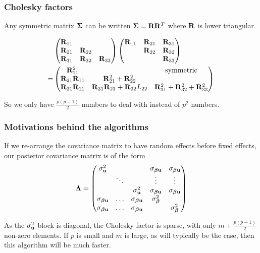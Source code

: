 \documentclass{beamer}
\begin{document}
\begin{frame}
\frametitle{Cholesky factors}
Any symmetric matrix ${\boldsymbol \Sigma}$ can be written ${\boldsymbol \Sigma} = {\bf R} {\bf R}^T$
where ${\bf R}$ is lower triangular.

\begin{align*}
&\begin{pmatrix}
{\bf R}_{11} \\
{\bf R}_{21} & {\bf R}_{22} \\
{\bf R}_{31} & {\bf R}_{32} & {\bf R}_{33}
\end{pmatrix}
\begin{pmatrix}
{\bf R}_{11} & {\bf R}_{21} & {\bf R}_{31} \\
& {\bf R}_{22} & {\bf R}_{32} \\
& & {\bf R}_{33}
\end{pmatrix}
\\
=& \begin{pmatrix}
{\bf R}_{11}^2 & & \text{symmetric}\\
{\bf R}_{21}{\bf R}_{11} & {\bf R}_{21}^2 + {\bf R}_{22}^2 \\
{\bf R}_{31} {\bf R}_{11} & {\bf R}_{31}{\bf R}_{21} + {\bf R}_{32}L_{22} & {\bf R}_{31}^2 + {\bf R}_{32} ^2 + {\bf R}_{33}^2
\end{pmatrix}
\end{align*}

So we only have $\frac{p(p-1)}{2}$ numbers to deal with instead of
$p^2$ numbers.

\end{frame}

\begin{frame}
\frametitle{Motivations behind the algorithms}
If we re-arrange the covariance matrix to have random effects before
fixed effects, our posterior covariance matrix is of the form
\begin{align*} {\boldsymbol\Lambda} =
\begin{pmatrix}
\sigma_{\bf u}^2 & & & \sigma_{{\boldsymbol \beta} {\bf u}} & \sigma_{{\boldsymbol \beta} {\bf u}} \\
& \ddots & & \vdots & \vdots \\
& & \sigma_{\bf u}^2 & \sigma_{{\boldsymbol \beta} {\bf u}} & \sigma_{{\boldsymbol \beta} {\bf u}} \\
\sigma_{{\boldsymbol \beta} {\bf u}} & \ldots & \sigma_{{\boldsymbol \beta} {\bf u}} & \sigma_{\boldsymbol \beta}^2 \\
\sigma_{{\boldsymbol \beta} {\bf u}} & \ldots &\sigma_{{\boldsymbol \beta} {\bf u}}  & & \sigma_{\boldsymbol \beta}^2
\end{pmatrix}
\end{align*}

As the $\sigma_{\bf u}^2$ block is diagonal, the Cholesky factor is 
sparse, with only $m + \frac{p(p-1)}{2}$ non-zero elements. If $p$ is small
and $m$ is large, as will typically be the case, then this algorithm will
be much faster.

\end{frame}
\end{document}

